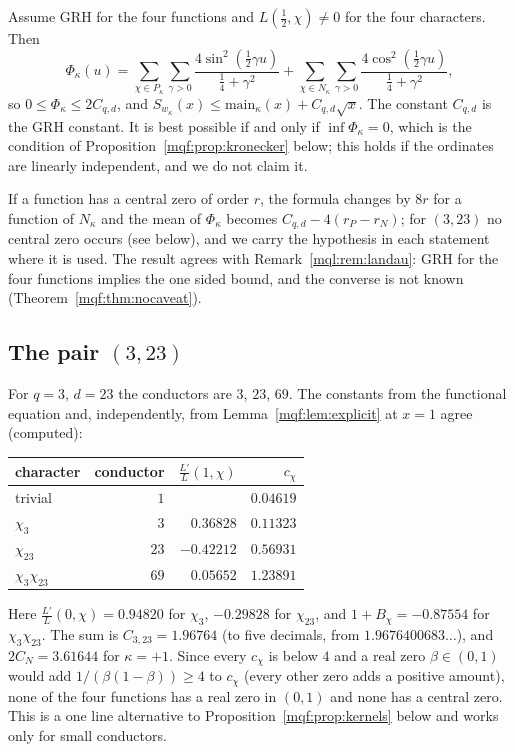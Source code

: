 \begin{proposition}\label{mqf:prop:slack}
Assume GRH for the four functions and $L(\frac12,\chi)\ne0$ for the four characters. Then
\[
\Phi_\kappa(u)=\sum_{\chi\in P_\kappa}\sum_{\gamma>0}\frac{4\sin^2(\frac12\gamma u)}{\frac14+\gamma^2}+\sum_{\chi\in N_\kappa}\sum_{\gamma>0}\frac{4\cos^2(\frac12\gamma u)}{\frac14+\gamma^2},
\]
so $0\le\Phi_\kappa\le2C_{q,d}$, and $S_{w_\kappa}(x)\le\mathrm{main}_\kappa(x)+C_{q,d}\sqrt x$. The constant $C_{q,d}$ is the GRH constant. It is best possible if and only if $\inf\Phi_\kappa=0$, which is the condition of Proposition~\ref{mqf:prop:kronecker} below; this holds if the ordinates are linearly independent, and we do not claim it.
\end{proposition}

If a function has a central zero of order $r$, the formula changes by $8r$ for a function of $N_\kappa$ and the mean of $\Phi_\kappa$ becomes $C_{q,d}-4(r_P-r_N)$; for $(3,23)$ no central zero occurs (see below), and we carry the hypothesis in each statement where it is used. The result agrees with Remark~\ref{mql:rem:landau}: GRH for the four functions implies the one sided bound, and the converse is not known (Theorem~\ref{mqf:thm:nocaveat}).

\subsection{The pair $(3,23)$}\label{mqf:sub:pair}

For $q=3$, $d=23$ the conductors are $3$, $23$, $69$. The constants from the functional equation and, independently, from Lemma~\ref{mqf:lem:explicit} at $x=1$ agree (computed):
\begin{center}
\begin{tabular}{lrrr}
\hline
character & conductor & $\frac{L'}{L}(1,\chi)$ & $c_\chi$\\
\hline
trivial & $1$ & & $0.04619$\\
$\chi_3$ & $3$ & $0.36828$ & $0.11323$\\
$\chi_{23}$ & $23$ & $-0.42212$ & $0.56931$\\
$\chi_3\chi_{23}$ & $69$ & $0.05652$ & $1.23891$\\
\hline
\end{tabular}
\end{center}
Here $\frac{L'}{L}(0,\chi)=0.94820$ for $\chi_3$, $-0.29828$ for $\chi_{23}$, and $1+B_\chi=-0.87554$ for $\chi_3\chi_{23}$. The sum is $C_{3,23}=1.96764$ (to five decimals, from $1.9676400683\ldots$), and $2C_N=3.61644$ for $\kappa=+1$. Since every $c_\chi$ is below $4$ and a real zero $\beta\in(0,1)$ would add $1/(\beta(1-\beta))\ge4$ to $c_\chi$ (every other zero adds a positive amount), none of the four functions has a real zero in $(0,1)$ and none has a central zero. This is a one line alternative to Proposition~\ref{mqf:prop:kernels} below and works only for small conductors.

